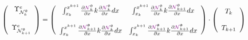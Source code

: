 \[
\left(
\begin{array}{cc}
{\Upsilon}_{{\mathcal{N}}_k^\uptheta}^e \\ \\ 
{\Upsilon}_{{\mathcal{N}}_{k+1}^\uptheta}^e
\end{array}
\right)
=
\left(
\begin{array}{cc}
\int_{x_k}^{x^{k+1}} \frac{\partial {\color{violet}{\mathcal{N}}}_k^\uptheta}{\partial x} 
k \frac{\partial  {\color{violet}{\mathcal{N}}}_{k}^\uptheta } {\partial x}  dx & 
\int_{x_k}^{x^{k+1}} \frac{\partial {\color{violet}{\mathcal{N}}}_k^\uptheta}{\partial x} 
k \frac{\partial  {\color{violet}{\mathcal{N}}}_{k+1}^\uptheta } {\partial x} dx 
\\ \\
\int_{x_k}^{x^{k+1}} \frac{\partial {\color{violet}{\mathcal{N}}}_{k+1}^\uptheta}{\partial x} 
k \frac{\partial  {\color{violet}{\mathcal{N}}}_{k}^\uptheta } {\partial x}  dx & 
\int_{x_k}^{x^{k+1}} \frac{\partial {\color{violet}{\mathcal{N}}}_{k+1}^\uptheta}{\partial x} 
k \frac{\partial  {\color{violet}{\mathcal{N}}}_{k+1}^\uptheta } {\partial x} dx 
\end{array}
\right)
\cdot
\left(
\begin{array}{c}
T_k \\ \\ T_{k+1}
\end{array}
\right)
\]

